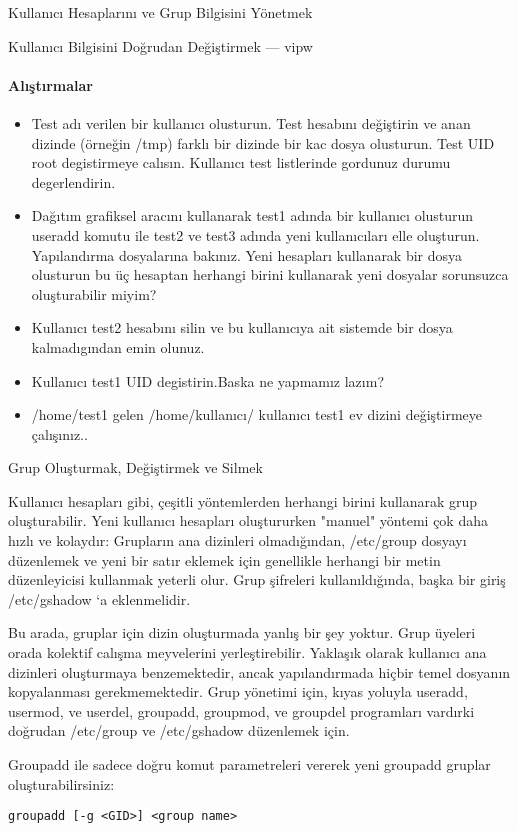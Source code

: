 \begin{section}{Kullanıcı Hesaplarını ve Grup Bilgisini Yönetmek}
\begin{subsection}{Kullanıcı Bilgisini Doğrudan Değiştirmek --- vipw}
\paragraph{Alıştırmalar}{
\begin{itemize}
\item Test adı verilen bir kullanıcı olusturun. Test hesabını değiştirin ve anan dizinde (örneğin /tmp) farklı bir dizinde bir kac dosya olusturun. Test UID root degistirmeye calısın. Kullanıcı test listlerinde gordunuz durumu degerlendirin.
\item Dağıtım grafiksel aracını kullanarak test1 adında bir kullanıcı olusturun useradd komutu ile test2 ve test3 adında yeni kullanıcıları elle oluşturun. Yapılandırma dosyalarına bakınız. Yeni hesapları kullanarak bir dosya olusturun bu üç hesaptan herhangi birini kullanarak yeni dosyalar sorunsuzca oluşturabilir miyim?
\item Kullanıcı test2 hesabını silin ve bu kullanıcıya ait sistemde bir dosya kalmadıgından emin olunuz.
\item Kullanıcı test1 UID degistirin.Baska ne yapmamız lazım?
\item /home/test1 gelen /home/kullanıcı/ kullanıcı test1 ev dizini değiştirmeye çalışınız..
\end{itemize}}
\end{subsection}
\begin{subsection}{Grup Oluşturmak, Değiştirmek ve Silmek}

Kullanıcı hesapları gibi, çeşitli yöntemlerden herhangi birini kullanarak grup oluşturabilir. Yeni kullanıcı hesapları oluştururken "manuel" yöntemi çok daha hızlı ve kolaydır: Grupların ana dizinleri olmadığından, /etc/group dosyayı düzenlemek ve yeni bir satır eklemek için genellikle herhangi bir metin düzenleyicisi kullanmak yeterli olur. Grup şifreleri kullanıldığında, başka bir giriş /etc/gshadow ‘a eklenmelidir.

Bu arada, gruplar için dizin oluşturmada yanlış bir şey yoktur. Grup üyeleri orada kolektif calışma meyvelerini yerleştirebilir. Yaklaşık olarak kullanıcı ana dizinleri oluşturmaya benzemektedir, ancak yapılandırmada hiçbir temel dosyanın kopyalanması gerekmemektedir. Grup yönetimi için, kıyas yoluyla useradd, usermod, ve userdel, groupadd, groupmod, ve groupdel programları vardırki doğrudan /etc/group ve /etc/gshadow düzenlemek için.

Groupadd ile sadece doğru komut parametreleri vererek yeni groupadd gruplar oluşturabilirsiniz:
\begin{verbatim}
groupadd [-g <GID>] <group name>
\end{verbatim}


\end{subsection}
\end{section}
